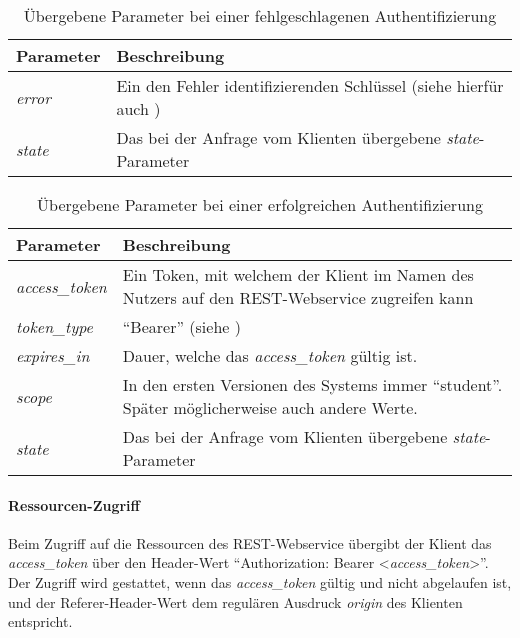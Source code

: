 \begin{table}
	\begin{tabularx}{\textwidth}{@{} | X | X | @{}}
		\hline
		\textbf{Parameter} & \textbf{Beschreibung}\\ \hline \hline
		\textit{error} & Ein den Fehler identifizierenden Schlüssel (siehe hierfür auch \cite[Kap. 4.2.2.1]{rfc6749})\\ \hline
		\textit{state} & Das bei der Anfrage vom Klienten übergebene \textit{state}-Parameter\\
		\hline
	\end{tabularx}
	\caption{Übergebene Parameter bei einer fehlgeschlagenen Authentifizierung}
	\label{tab:api-auth-login-res-error}
\end{table}

\begin{table}
	\begin{tabularx}{\textwidth}{@{} | X | X | @{}}
		\hline
		\textbf{Parameter} & \textbf{Beschreibung}\\ \hline \hline
		\textit{access\_token} & Ein Token, mit welchem der Klient im Namen des Nutzers auf den REST-Webservice zugreifen kann\\ \hline
		\textit{token\_type} & \enquote{Bearer} (siehe \cite[Kap. 7.1]{rfc6749}) \\ \hline
		\textit{expires\_in} & Dauer, welche das \textit{access\_token} gültig ist. \\ \hline
		\textit{scope} & In den ersten Versionen des Systems immer \enquote{student}. Später möglicherweise auch andere Werte.\\ \hline
		\textit{state} & Das bei der Anfrage vom Klienten übergebene \textit{state}-Parameter\\
		\hline
	\end{tabularx}
	\caption{Übergebene Parameter bei einer erfolgreichen Authentifizierung}
	\label{tab:api-auth-login-res-success}
\end{table}

\paragraph{Ressourcen-Zugriff}
Beim Zugriff auf die Ressourcen des REST-Webservice übergibt der Klient das \textit{access\_token} über den Header-Wert \enquote{Authorization: Bearer <\textit{access\_token}>}.
Der Zugriff wird gestattet, wenn das \textit{access\_token} gültig und nicht abgelaufen ist, und der Referer-Header-Wert dem regulären Ausdruck \textit{origin} des Klienten entspricht.